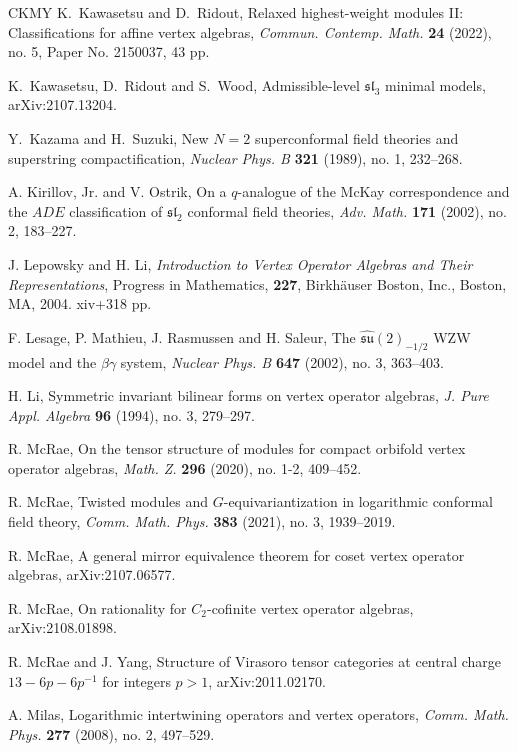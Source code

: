 \documentclass[11pt, reqno]{amsart}
\theoremstyle{definition}\newtheorem{defi}[thm]{Definition}
\theoremstyle{definition}\newtheorem{rem}[thm]{Remark}
\theoremstyle{definition}\newtheorem{exam}[thm]{Example}
\theoremstyle{definition}\newtheorem{assum}[thm]{Assumption}
\begin{document}
\begin{thebibliography}{CKMY}
K.~Kawasetsu and D.~Ridout,
Relaxed highest-weight modules II: Classifications for affine vertex algebras,
\textit{Commun. Contemp. Math.} \textbf{24} (2022), no. 5, Paper No. 2150037, 43 pp.

K.~Kawasetsu, D.~Ridout and S.~Wood,
Admissible-level $\mathfrak{sl}_3$ minimal models,
arXiv:2107.13204.

Y.~Kazama and H.~Suzuki,
New $N=2$ superconformal field theories and superstring compactification,
\textit{Nuclear Phys. B} \textbf{321} (1989), no. 1, 232--268.

A. Kirillov, Jr. and V. Ostrik, On a $q$-analogue of the McKay correspondence and the $ADE$ classification of $\mathfrak{sl}_2$ conformal field theories, \textit{Adv. Math.} \textbf{171} (2002), no. 2, 183--227.

J. Lepowsky and H. Li, \textit{Introduction to Vertex
Operator Algebras and Their Representations}, Progress in Mathematics, \textbf{227}, Birkh\"{a}user Boston, Inc., Boston, MA, 2004. xiv+318 pp.

F. Lesage, P. Mathieu, J. Rasmussen and H. Saleur, The $\widehat{\mathfrak{su}}(2)_{-1/2}$ WZW model and the $\beta\gamma$ system,
\textit{Nuclear Phys. B} \textbf{647} (2002), no. 3, 363--403. 

H. Li, Symmetric invariant bilinear forms on vertex operator algebras, \textit{J. Pure Appl. Algebra} \textbf{96} (1994), no. 3, 279--297.

 R. McRae, On the tensor structure of modules for compact orbifold vertex operator algebras, \textit{Math. Z.} \textbf{296} (2020), no. 1-2, 409--452.

R. McRae, Twisted modules and $G$-equivariantization in logarithmic conformal field theory, \textit{Comm. Math. Phys.} \textbf{383} (2021), no. 3, 1939--2019.

R. McRae, A general mirror equivalence theorem for coset vertex operator algebras, arXiv:2107.06577.

R. McRae, On rationality for $C_2$-cofinite vertex operator algebras, arXiv:2108.01898.

R. McRae and J. Yang, Structure of Virasoro tensor categories at central charge $13-6p-6p^{-1}$ for integers $p>1$, arXiv:2011.02170.

A. Milas, Logarithmic intertwining operators and vertex operators, \textit{Comm. Math. Phys.} \textbf{277} (2008), no. 2, 497--529. 


\end{thebibliography}
\end{document}
